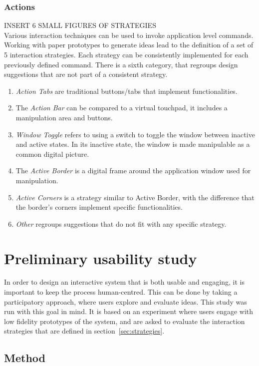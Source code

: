 \subsubsection{Actions}

INSERT 6 SMALL FIGURES OF STRATEGIES
\hfill\\
Various interaction techniques can be used to invoke application level commands.
Working with paper prototypes to generate ideas lead to the definition of a set of 5 interaction strategies.
Each strategy can be consistently implemented for each previously defined command.
There is a sixth category, that regroups design suggestions that are not part of a consistent strategy.

\begin{enumerate}
\item{\emph{Action Tabs} are traditional buttons/tabs that implement functionalities.}
\item{The \emph{Action Bar} can be compared to a virtual touchpad, it includes a manipulation area and buttons.}
\item{\emph{Window Toggle} refers to using a switch to toggle the window between inactive and active states. In its inactive state, the window is made manipulable as a common digital picture.}
\item{The \emph{Active Border} is a digital frame around the application window used for manipulation.}
\item{\emph{Active Corners} is a strategy similar to Active Border, with the difference that the border's corners implement specific functionalities.}
\item{\emph{Other} regroups suggestions that do not fit with any specific strategy.}
\end{enumerate}

\section{Preliminary usability study}

In order to design an interactive system that is both usable and engaging, it is important to keep the process human-centred.
This can be done by taking a participatory approach, where users explore and evaluate ideas.
This study was run with this goal in mind.
It is based on an experiment where users engage with low fidelity prototypes of the system, and are asked to evaluate the interaction strategies that are defined in section~\ref{sec:strategies}.

\subsection{Method}	

